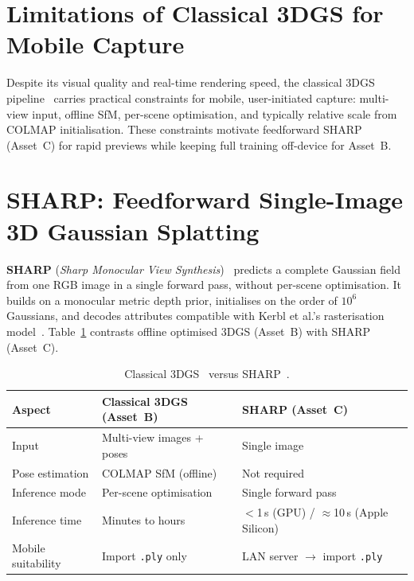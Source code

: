 \section{Limitations of Classical 3DGS for Mobile Capture}
\label{sec:3dgs_limitations}

Despite its visual quality and real-time rendering speed, the classical 3DGS pipeline~\cite{kerbl20233dgs} carries practical constraints for mobile, user-initiated capture: multi-view input, offline SfM, per-scene optimisation, and typically relative scale from COLMAP initialisation. These constraints motivate feedforward SHARP (Asset~C) for rapid previews while keeping full training off-device for Asset~B.

\section{SHARP: Feedforward Single-Image 3D Gaussian Splatting}
\label{sec:sharp}

\textbf{SHARP} (\emph{Sharp Monocular View Synthesis})~\cite{sharp-monocular-view} predicts a complete Gaussian field from one RGB image in a single forward pass, without per-scene optimisation. It builds on a monocular metric depth prior, initialises on the order of $10^6$ Gaussians, and decodes attributes compatible with Kerbl et al.'s rasterisation model~\cite{kerbl20233dgs}. Table~\ref{tab:3dgs_vs_sharp} contrasts offline optimised 3DGS (Asset~B) with SHARP (Asset~C).

\begin{table}[h]
\centering
\caption{Classical 3DGS~\cite{kerbl20233dgs} versus SHARP~\cite{sharp-monocular-view}.}
\label{tab:3dgs_vs_sharp}
\setlength{\tabcolsep}{4pt}
\begin{tabular}{p{2.8cm} p{4.3cm} p{4.3cm}}
\toprule
\textbf{Aspect} & \textbf{Classical 3DGS (Asset~B)} & \textbf{SHARP (Asset~C)} \\
\midrule
Input             & Multi-view images + poses & Single image \\
Pose estimation   & COLMAP SfM (offline)      & Not required \\
Inference mode    & Per-scene optimisation    & Single forward pass \\
Inference time    & Minutes to hours          & ${<}$1\,s (GPU) / ${\approx}$10\,s (Apple Silicon) \\
Mobile suitability & Import \texttt{.ply} only & LAN server $\rightarrow$ import \texttt{.ply} \\
\bottomrule
\end{tabular}
\end{table}

